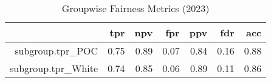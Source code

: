 \begin{table}[ht]
\centering
\begin{tabular}{rrrrrrr}
  \hline
 & tpr & npv & fpr & ppv & fdr & acc \\ 
  \hline
subgroup.tpr\_POC & 0.75 & 0.89 & 0.07 & 0.84 & 0.16 & 0.88 \\ 
  subgroup.tpr\_White & 0.74 & 0.85 & 0.06 & 0.89 & 0.11 & 0.86 \\ 
   \hline
\end{tabular}
\caption{Groupwise Fairness Metrics (2023)} 
\label{tab:groupwise_metrics_2023}
\end{table}

